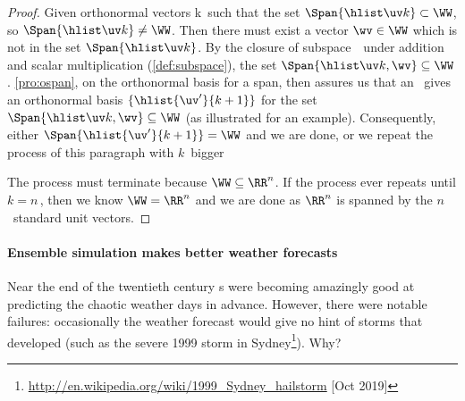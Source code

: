 \begin{proof}
Given orthonormal vectors \hlist\uv k\ such that the set \(\Span\{\hlist\uv k\}\subset\WW\), so \(\Span\{\hlist\uv k\}\neq\WW\).  
Then there must exist a vector \(\wv\in\WW\) which is not in the set \(\Span\{\hlist\uv k\}\).
By the closure of subspace~\WW\ under addition and scalar multiplication (\cref{def:subspace}), the set \(\Span\{\hlist\uv k,\wv\}\subseteq\WW\).
\cref{pro:ospan}, on the orthonormal basis for a span, then assures us that an \svd\ gives an orthonormal basis \(\{\hlist{\uv'}{k+1}\}\) for the set \(\Span\{\hlist\uv k,\wv\}\subseteq\WW\) (as illustrated for an example).
Consequently, either \(\Span\{\hlist{\uv'}{k+1}\}=\WW\) and we are done, or we repeat the process of this paragraph with \(k\)~bigger 
\begin{center}
\end{center}

The process must terminate because \(\WW\subseteq\RR^n\). 
If the process ever repeats until \(k=n\)\,, then we know \(\WW=\RR^n\) and we are done as \(\RR^n\) is spanned by the \(n\)~standard unit vectors.
\end{proof}





\paragraph{Ensemble simulation makes better weather forecasts}
Near the end of the twentieth century s were becoming amazingly good at predicting the chaotic weather days in advance.
However, there were notable failures: occasionally the weather forecast would give no hint of storms that developed (such as the severe 1999 storm in Sydney\footnote{\url{http://en.wikipedia.org/wiki/1999_Sydney_hailstorm} [Oct 2019]}).
Why?

